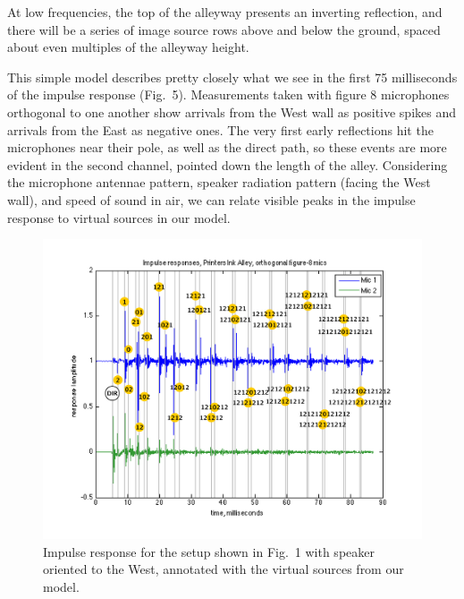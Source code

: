 \documentclass{aes137}
\begin{document}
At low frequencies, the top of the alleyway presents an inverting reflection, and there will be a series of image source rows above and below the ground, spaced about even multiples of the alleyway height. 

This simple model describes pretty closely what we see in the first 75 milliseconds of the impulse response (Fig.~5). Measurements taken with figure 8 microphones orthogonal to one another show arrivals from the West wall as positive spikes and arrivals from the East as negative ones. The very first early reflections hit the microphones near their pole, as well as the direct path, so these events are more evident in the second channel, pointed down the length of the alley. Considering the microphone antennae pattern, speaker radiation pattern (facing the West wall), and speed of sound in air, we can relate visible peaks in the impulse response to virtual sources in our model.

\begin{figure}[h!] \centering \includegraphics[width=\linewidth]{images/annotated_reflections_v2.pdf} \caption{Impulse response for the setup shown in Fig.~1 with speaker oriented to the West, annotated with the virtual sources from our model.} \end{figure}

\end{document}
